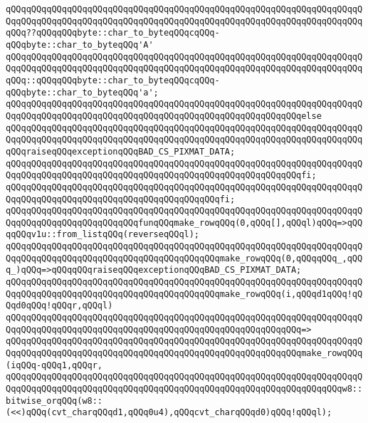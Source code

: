 \verb|qQQqqQQqqQQqqQQqqQQqqQQqqQQqqQQqqQQqqQQqqQQqqQQqqQQqqQQqqQQqqQQqqQQqqQQqqQQqqQQqqQQqqQQqqQQqqQQqqQQqqQQqqQQqqQQqqQQqqQQqqQQqqQQqqQQqqQQqqQQqqQQq??qQQqqQQqbyte::char_to_byteqQQqcqQQq-qQQqbyte::char_to_byteqQQq'A'|\newline
\verb|qQQqqQQqqQQqqQQqqQQqqQQqqQQqqQQqqQQqqQQqqQQqqQQqqQQqqQQqqQQqqQQqqQQqqQQqqQQqqQQqqQQqqQQqqQQqqQQqqQQqqQQqqQQqqQQqqQQqqQQqqQQqqQQqqQQqqQQqqQQqqQQq::qQQqqQQqbyte::char_to_byteqQQqcqQQq-qQQqbyte::char_to_byteqQQq'a';|\newline
\verb|qQQqqQQqqQQqqQQqqQQqqQQqqQQqqQQqqQQqqQQqqQQqqQQqqQQqqQQqqQQqqQQqqQQqqQQqqQQqqQQqqQQqqQQqqQQqqQQqqQQqqQQqqQQqqQQqqQQqqQQqqQQqqQQqelse|\newline
\verb|qQQqqQQqqQQqqQQqqQQqqQQqqQQqqQQqqQQqqQQqqQQqqQQqqQQqqQQqqQQqqQQqqQQqqQQqqQQqqQQqqQQqqQQqqQQqqQQqqQQqqQQqqQQqqQQqqQQqqQQqqQQqqQQqqQQqqQQqqQQqqQQqraiseqQQqexceptionqQQqBAD_CS_PIXMAT_DATA;|\newline
\verb|qQQqqQQqqQQqqQQqqQQqqQQqqQQqqQQqqQQqqQQqqQQqqQQqqQQqqQQqqQQqqQQqqQQqqQQqqQQqqQQqqQQqqQQqqQQqqQQqqQQqqQQqqQQqqQQqqQQqqQQqqQQqqQQqfi;|\newline
\verb|qQQqqQQqqQQqqQQqqQQqqQQqqQQqqQQqqQQqqQQqqQQqqQQqqQQqqQQqqQQqqQQqqQQqqQQqqQQqqQQqqQQqqQQqqQQqqQQqqQQqqQQqqQQqqQQqfi;|\newline
\newline
\verb|qQQqqQQqqQQqqQQqqQQqqQQqqQQqqQQqqQQqqQQqqQQqqQQqqQQqqQQqqQQqqQQqqQQqqQQqqQQqqQQqqQQqqQQqqQQqqQQqfunqQQqmake_rowqQQq(0,qQQq[],qQQql)qQQq=>qQQqqQQqv1u::from_listqQQq(reverseqQQql);|\newline
\verb|qQQqqQQqqQQqqQQqqQQqqQQqqQQqqQQqqQQqqQQqqQQqqQQqqQQqqQQqqQQqqQQqqQQqqQQqqQQqqQQqqQQqqQQqqQQqqQQqqQQqqQQqqQQqqQQqmake_rowqQQq(0,qQQqqQQq_,qQQq_)qQQq=>qQQqqQQqraiseqQQqexceptionqQQqBAD_CS_PIXMAT_DATA;|\newline
\newline
\verb|qQQqqQQqqQQqqQQqqQQqqQQqqQQqqQQqqQQqqQQqqQQqqQQqqQQqqQQqqQQqqQQqqQQqqQQqqQQqqQQqqQQqqQQqqQQqqQQqqQQqqQQqqQQqqQQqmake_rowqQQq(i,qQQqd1qQQq!qQQqd0qQQq!qQQqr,qQQql)|\newline
\verb|qQQqqQQqqQQqqQQqqQQqqQQqqQQqqQQqqQQqqQQqqQQqqQQqqQQqqQQqqQQqqQQqqQQqqQQqqQQqqQQqqQQqqQQqqQQqqQQqqQQqqQQqqQQqqQQqqQQqqQQqqQQqqQQq=>|\newline
\verb|qQQqqQQqqQQqqQQqqQQqqQQqqQQqqQQqqQQqqQQqqQQqqQQqqQQqqQQqqQQqqQQqqQQqqQQqqQQqqQQqqQQqqQQqqQQqqQQqqQQqqQQqqQQqqQQqqQQqqQQqqQQqqQQqmake_rowqQQq(iqQQq-qQQq1,qQQqr,|\newline
\verb|qQQqqQQqqQQqqQQqqQQqqQQqqQQqqQQqqQQqqQQqqQQqqQQqqQQqqQQqqQQqqQQqqQQqqQQqqQQqqQQqqQQqqQQqqQQqqQQqqQQqqQQqqQQqqQQqqQQqqQQqqQQqqQQqqQQqqQQqw8::bitwise_orqQQq(w8::(<<)qQQq(cvt_charqQQqd1,qQQq0u4),qQQqcvt_charqQQqd0)qQQq!qQQql);|\newline
